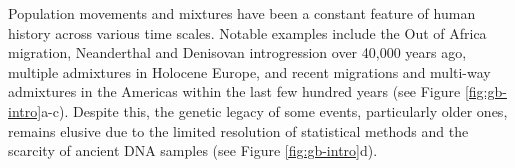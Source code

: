 




Population movements and mixtures have been a constant feature of human history across various time scales. Notable examples include the Out of Africa migration, Neanderthal and Denisovan introgression over 40,000 years ago, multiple admixtures in Holocene Europe, and recent migrations and multi-way admixtures in the Americas within the last few hundred years (see Figure \ref{fig:gb-intro}a-c). Despite this, the genetic legacy of some events, particularly older ones, remains elusive due to the limited resolution of statistical methods and the scarcity of ancient DNA samples (see Figure \ref{fig:gb-intro}d).

